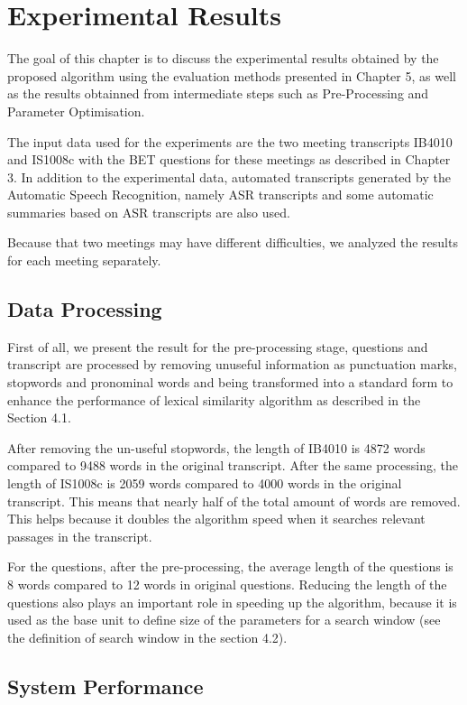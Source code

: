 \chapter{Experimental Results}
The goal of this chapter is to discuss the experimental results obtained by the proposed algorithm using the evaluation methods  presented in  Chapter 5, as well as the results obtainned from intermediate steps such as Pre-Processing and Parameter Optimisation. 

The input data used for the experiments are the two meeting transcripts IB4010 and IS1008c with the BET questions for these meetings as described in Chapter 3. In addition to the experimental data, automated transcripts generated by the Automatic Speech Recognition, namely ASR transcripts and some automatic summaries based on ASR transcripts are also used. 

Because that two meetings may have different difficulties, we analyzed the results for each meeting separately.

\section{Data Processing}


First of all, we present the result for the pre-processing stage, questions and transcript are processed by removing unuseful information as punctuation marks, stopwords and pronominal words and being transformed into a standard form to enhance the performance of lexical similarity algorithm as described in the Section 4.1.

After removing the un-useful stopwords, the length of IB4010 is 4872 words compared to 9488 words in the original transcript. After the same processing, the length of IS1008c is 2059 words compared to 4000 words in the original transcript. This means that nearly half of the total amount of words are removed. This helps because it doubles the algorithm speed when it searches relevant passages in the transcript.

For the questions, after the pre-processing, the average length of the questions is 8 words compared to 12 words in original questions. Reducing the length of the questions also plays an important role in speeding up the algorithm, because it is used as the base unit to define size of the parameters for a search window (see the definition of search window in the section 4.2).

\section{System Performance}



